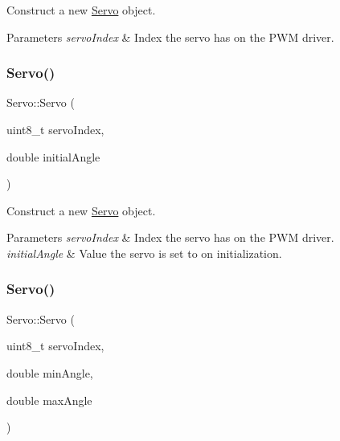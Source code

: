 Construct a new \mbox{\hyperlink{classServo}{Servo}} object. 


\begin{DoxyParams}{Parameters}
{\em servo\+Index} & Index the servo has on the P\+WM driver. \\
\hline
\end{DoxyParams}
\mbox{\label{classServo_aec2c479518249cd444854c5dbb94b38f}} 
\subsubsection{\texorpdfstring{Servo()}{Servo()}\hspace{0.1cm}{\footnotesize\ttfamily [2/4]}}
{\footnotesize\ttfamily Servo\+::\+Servo (\begin{DoxyParamCaption}\item[{uint8\+\_\+t}]{servo\+Index,  }\item[{double}]{initial\+Angle }\end{DoxyParamCaption})}



Construct a new \mbox{\hyperlink{classServo}{Servo}} object. 


\begin{DoxyParams}{Parameters}
{\em servo\+Index} & Index the servo has on the P\+WM driver. \\
\hline
{\em initial\+Angle} & Value the servo is set to on initialization. \\
\hline
\end{DoxyParams}
\mbox{\label{classServo_a0bac7b17dbff704a36c75dd476c133f8}} 
\subsubsection{\texorpdfstring{Servo()}{Servo()}\hspace{0.1cm}{\footnotesize\ttfamily [3/4]}}
{\footnotesize\ttfamily Servo\+::\+Servo (\begin{DoxyParamCaption}\item[{uint8\+\_\+t}]{servo\+Index,  }\item[{double}]{min\+Angle,  }\item[{double}]{max\+Angle }\end{DoxyParamCaption})}



